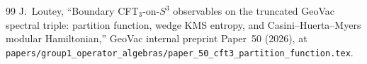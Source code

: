 \documentclass[11pt,a4paper]{article}
\theoremstyle{plain}
\theoremstyle{definition}
\begin{document}
\begin{thebibliography}{99}
J.~Loutey, ``Boundary CFT$_3$-on-$S^3$ observables on the truncated
GeoVac spectral triple: partition function, wedge KMS entropy, and
Casini--Huerta--Myers modular Hamiltonian,'' GeoVac internal preprint
Paper~50 (2026), at
\texttt{papers/group1\_operator\_algebras/paper\_50\_cft3\_partition\_function.tex}.

\end{thebibliography}
\end{document}
